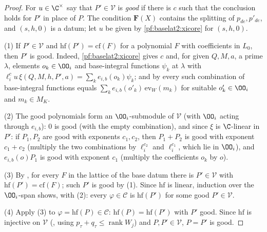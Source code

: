 \begin{proof}
For $u\in\C^\times$ say that $P'\in\mathcal V$ is \emph{good} if there is $c$ such that the conclusion holds for $P'$ in place of
$P$. The condition $\mathbf F(X)$ contains the splitting of $p_{de},p'_{de}$, and $(s,h,0)$ is a datum; let $u$ be given
by \cref{pf:baselat2:xicore} for $(s,h,0)$.

(1) If $P'\in\mathcal V$ and $\mathrm{hf}(P')=\mathrm{cf}(F)$ for a polynomial $F$ with coefficients in $L_0$, then $P'$ is good.
Indeed, \cref{pf:baselat2:xicore} gives $c$ and, for given $Q,M,a$, a prime $\lambda$, elements $o_k\in\OO_i$ and
base-integral functions $\psi_k$ at $\lambda$ with $\ell_i^cu\,\xi(Q,M,h,P',a)=\sum_ke_{i,b}(o_k)\psi_k$; and by
 every such combination of base-integral functions
equals $\sum_ke_{i,b}(o'_k)\,\mathrm{ev}_W(m_k)$ for suitable $o'_k\in\OO_i$ and $m_k\in M_K$.

(2) The good polynomials form an $\OO_i$-submodule of $\mathcal V$ (with $\OO_i$ acting through $e_{i,b}$): $0$ is good (with
the empty combination), and since $\xi$ is $\C$-linear in $P'$: if $P_1,P_2$ are good with exponents $c_1,c_2$, then
$P_1+P_2$ is good with exponent $c_1+c_2$ (multiply the two combinations by $\ell_i^{c_2}$ and $\ell_i^{c_1}$, which lie in
$\OO_i$), and $e_{i,b}(o)P_1$ is good with exponent $c_1$ (multiply the coefficients $o_k$ by $o$).

(3) By , for every $F$ in the
lattice of the base datum there is $P'\in\mathcal V$ with $\mathrm{hf}(P')=\mathrm{cf}(F)$; such $P'$ is good by (1). Since $\mathrm{hf}$ is linear,
induction over the $\OO_i$-span shows, with (2): every $\varphi\in\mathcal C$ is $\mathrm{hf}(P')$ for some good $P'\in\mathcal V$.

(4) Apply (3) to $\varphi=\mathrm{hf}(P)\in\mathcal C$: $\mathrm{hf}(P)=\mathrm{hf}(P')$ with $P'$ good. Since $\mathrm{hf}$ is injective on $\mathcal V$
(, using $p_\tau+q_\tau\le\operatorname{rank}W_j$) and
$P,P'\in\mathcal V$, $P=P'$ is good.
\end{proof}

